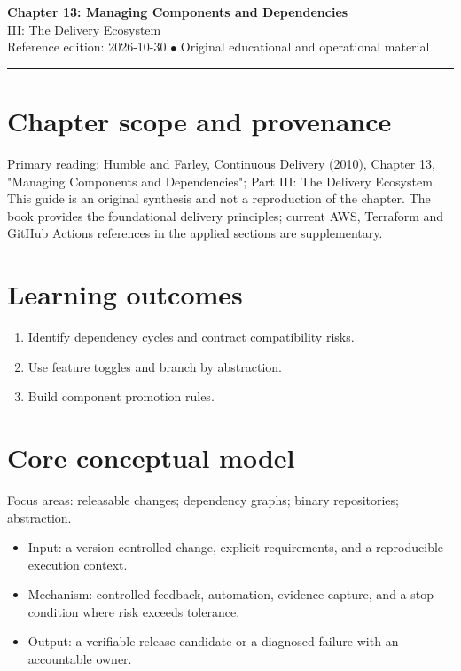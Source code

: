 \documentclass[10pt,letterpaper]{article}
\begin{document}
\begin{center}
{\LARGE\bfseries\color{cdblue}Chapter 13: Managing Components and Dependencies}\\[7pt]
{\large III: The Delivery Ecosystem}\\[6pt]
{\small Reference edition: 2026-10-30 $\bullet$ Original educational and operational material}
\end{center}
\noindent\color{cdblue}\rule{\linewidth}{1.2pt}\color{black}
\vspace{0.4em}
\section{Chapter scope and provenance}
Primary reading: Humble and Farley, Continuous Delivery (2010), Chapter 13, "Managing Components and Dependencies"; Part III: The Delivery Ecosystem. This guide is an original synthesis and not a reproduction of the chapter. The book provides the foundational delivery principles; current AWS, Terraform and GitHub Actions references in the applied sections are supplementary.


\section{Learning outcomes}
\begin{enumerate}
\item Identify dependency cycles and contract compatibility risks.
\item Use feature toggles and branch by abstraction.
\item Build component promotion rules.
\end{enumerate}

\section{Core conceptual model}
Focus areas: releasable changes; dependency graphs; binary repositories; abstraction.

\begin{itemize}
\item Input: a version-controlled change, explicit requirements, and a reproducible execution context.
\item Mechanism: controlled feedback, automation, evidence capture, and a stop condition where risk exceeds tolerance.
\item Output: a verifiable release candidate or a diagnosed failure with an accountable owner.
\end{itemize}
\end{document}

